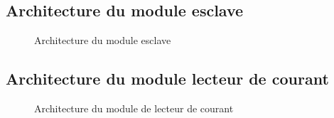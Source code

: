	\subsection{Architecture du module esclave}
	
	\begin{figure}[H]
		\centering
		\caption{Architecture du module esclave}
		\label{fig:architecture_slave}
	\end{figure}

	\subsection{Architecture du module lecteur de courant}
	
	\begin{figure}[H]
		\centering
		\caption{Architecture du module de lecteur de courant}
		\label{fig:architecturelecturecourant}
	\end{figure}
	